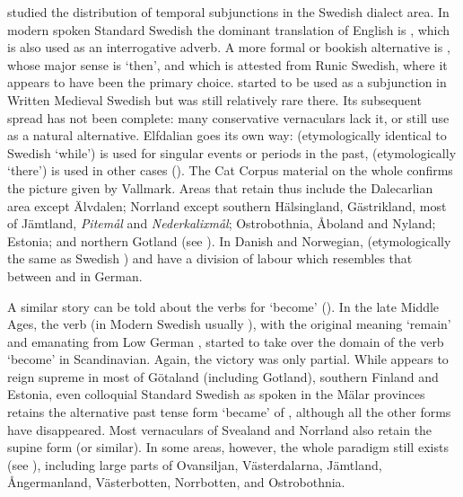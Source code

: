 \citet{Vallmark1937} studied the distribution of temporal subjunctions in the Swedish dialect area. In modern spoken Standard Swedish the dominant translation of English  is , which is also used as an interrogative adverb. A more formal or bookish alternative is , whose major sense is ‘then’, and which is attested from Runic Swedish, where it appears to have been the primary choice. started to be used as a subjunction in Written Medieval Swedish but was still relatively rare there. Its subsequent spread has not been complete: many conservative vernaculars lack it, or still use as a natural alternative. Elfdalian goes its own way:  (etymologically identical to Swedish  ‘while’) is used for singular events or periods in the past,  (etymologically ‘there’) is used in other cases (\citealt[152]{Åkerberg2012}). The Cat Corpus material on the whole confirms the picture given by Vallmark. Areas that retain  thus include the Dalecarlian area except Älvdalen; Norrland except southern Hälsingland, Gästrikland, most of Jämtland, \textit{Pitemål} and \textit{Nederkalixmål}; Ostrobothnia, Åboland and Nyland; Estonia; and northern Gotland (see ). In Danish and Norwegian,  (etymologically the same as Swedish ) and  have a division of labour which resembles that between  and  in German. 

A similar story can be told about the verbs for ‘become’ (\citealt{Markey1969}). In the late Middle Ages, the verb (in Modern Swedish usually ), with the original meaning ‘remain’ and emanating from Low German , started to take over the domain of the verb  ‘become’ in Scandinavian. Again, the victory was only partial. While appears to reign supreme in most of Götaland (including Gotland), southern Finland and Estonia, even colloquial Standard Swedish as spoken in the Mälar provinces retains the alternative past tense form  ‘became’ of , although all the other forms have disappeared. Most vernaculars of Svealand and Norrland also retain the supine form  (or similar). In some areas, however, the whole paradigm still exists (see ), including large parts of Ovansiljan, Västerdalarna, Jämtland, Ångermanland, Västerbotten, Norrbotten, and Ostrobothnia.

